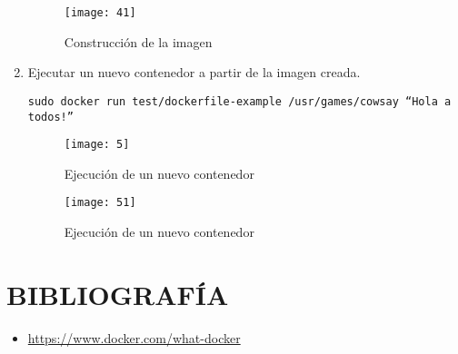 \documentclass[10pt]{article}   			%
\begin{document}
\begin{enumerate}
\begin{figure}[ht]
	\centering
	\texttt{[image: 41]}   
	\caption{Construcción de la imagen} 
\end{figure}

\item Ejecutar un nuevo contenedor a partir de la imagen creada.

\begin{center}
	\texttt{sudo docker run test/dockerfile-example /usr/games/cowsay “Hola a todos!”}
\end{center}
\begin{figure}[ht]
	\centering
	\texttt{[image: 5]}   
	\caption{Ejecución de un nuevo contenedor} 
\end{figure}
\begin{figure}[H]
	\centering
	\texttt{[image: 51]}   
	\caption{Ejecución de un nuevo contenedor} 
\end{figure}

\end{enumerate}

\section{BIBLIOGRAFÍA}

\begin{itemize}
	\item \href{https://www.docker.com/what-docker}{https://www.docker.com/what-docker}
	
	
\end{itemize}
	
\end{document}
